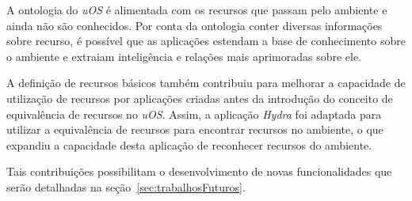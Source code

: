 A ontologia do \emph{uOS} é alimentada com os recursos que passam pelo ambiente e ainda não são conhecidos. Por conta da ontologia conter diversas informações sobre recurso, é possível que as aplicações estendam a base de conhecimento sobre o ambiente e extraiam inteligência e relações mais aprimoradas sobre ele.

A definição de recursos básicos também contribuiu para melhorar a capacidade de utilização de recursos por aplicações criadas antes da introdução do conceito de equivalência de recursos no \emph{uOS}. Assim, a aplicação \emph{Hydra} foi adaptada para utilizar a equivalência de recursos para encontrar recursos no ambiente, o que expandiu a capacidade desta aplicação de reconhecer recursos do ambiente.

Tais contribuições possibilitam o desenvolvimento de novas funcionalidades que serão detalhadas na seção~\ref{sec:trabalhosFuturos}.


